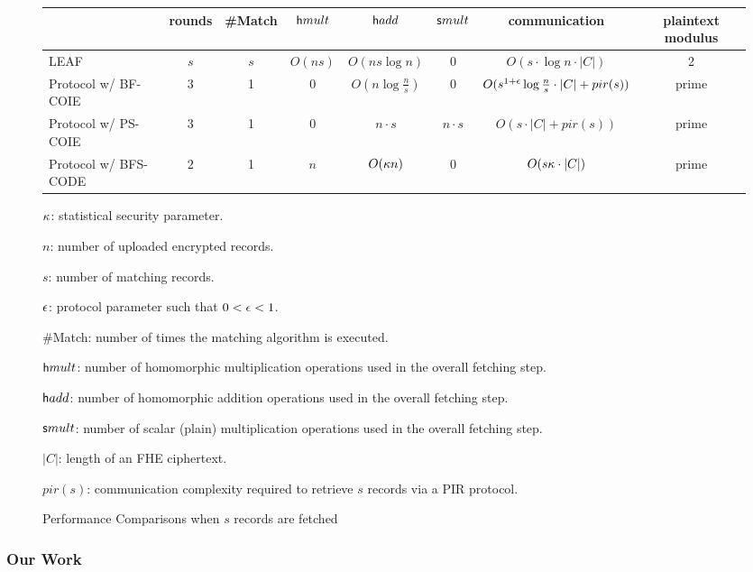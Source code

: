 \begin{figure}
\begin{tabular}{lccccccc}
\hline 
  & rounds & \#Match & ${\sf hmult}$ & ${\sf hadd}$ & ${\sf smult}$ & communication  & plaintext modulus \\
\hline 
LEAF~\cite{CCS:WYXZ20}    & $s$ & $s$ & $O(ns)$   &  $O(ns\log n)$     & 0      & $O(s \cdot \log n \cdot |C|)$ & 2 \\ 
Protocol w/ BF-COIE   & $3$ & 1 &  0 & $O(n \log \frac n s)$ & 0               & $O(s^{1+\e} \log \frac n s \cdot |C| + pir(s))$ & prime \\
Protocol w/ PS-COIE   & $3$ & 1 & 0 & $n \cdot s$   &  $n \cdot s$                  & $O(s \cdot |C| + pir(s) )$ & prime \\ 
Protocol w/ BFS-CODE  & $2$ & 1 & $n$    &    $O(\secparam n)$ &   0        & $O(s \secparam \cdot |C|)$ & prime \\ 
\hline
\end{tabular}


\BI
\item $\secparam$: statistical security parameter.
\item $n$: number of uploaded encrypted records.
\item $s$: number of matching records. 
\item $\e$: protocol parameter such that $0 < \e < 1$.
\item \#Match: number of times the matching algorithm is executed. 
\item ${\sf hmult}$: number of homomorphic multiplication operations
used in the overall fetching step.
\item ${\sf hadd}$: number of homomorphic addition operations used in the overall fetching step. 
\item ${\sf smult}$: number of scalar (plain) multiplication
operations used in the overall fetching step.
\item $|C|$: length of an FHE ciphertext.
\item $pir(s)$: communication complexity required to retrieve $s$ records via a PIR protocol. 
\EI

\caption{Performance Comparisons when $s$ records are fetched\label{fig:comparison}}
\end{figure}


\subsubsection{Our Work}
